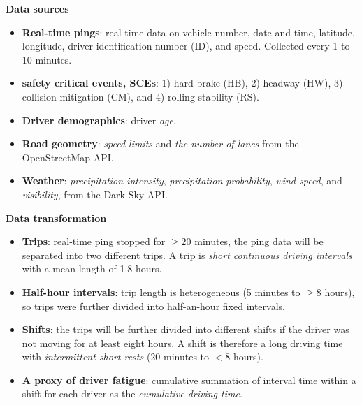 \documentclass[aspectratio=43]{beamer}
\begin{document}
\begin{frame}{\textbf{Data sources}}
    \begin{itemize}
      \item \textbf{Real-time pings}: real-time data on vehicle number, date and time, latitude, longitude, driver identification number (ID), and speed. Collected every 1 to 10 minutes.
      \item \textbf{safety critical events, SCEs}: 1) hard brake (HB), 2) headway (HW), 3) collision mitigation (CM), and 4) rolling stability (RS).
      \item \textbf{Driver demographics}: driver \textit{age}.
      \item \textbf{Road geometry}: \textit{speed limits} and \textit{the number of lanes} from the OpenStreetMap API.
      \item \textbf{Weather}: \textit{precipitation intensity}, \textit{precipitation probability}, \textit{wind speed}, and \textit{visibility}, from the Dark Sky API.
  \end{itemize}
\end{frame}

\begin{frame}{\textbf{Data transformation}}
    \begin{itemize}
      \item \textbf{Trips}:  real-time ping stopped for $\geq20$ minutes, the ping data will be separated into two different trips. A trip is \textit{short continuous driving intervals} with a mean length of 1.8 hours.
      \item \textbf{Half-hour intervals}: trip length is heterogeneous (5 minutes to $\geq8$ hours),  so trips were further divided into half-an-hour fixed intervals.
      \item \textbf{Shifts}: the trips will be further divided into different shifts if the driver was not moving for at least eight hours. A shift is therefore a long driving time with \textit{intermittent short rests} (20 minutes to $<8$ hours).
      \item \textbf{A proxy of driver fatigue}: cumulative summation of interval time within a shift for each driver as the \textit{cumulative driving time}.
  \end{itemize}
\end{frame}
\end{document}
